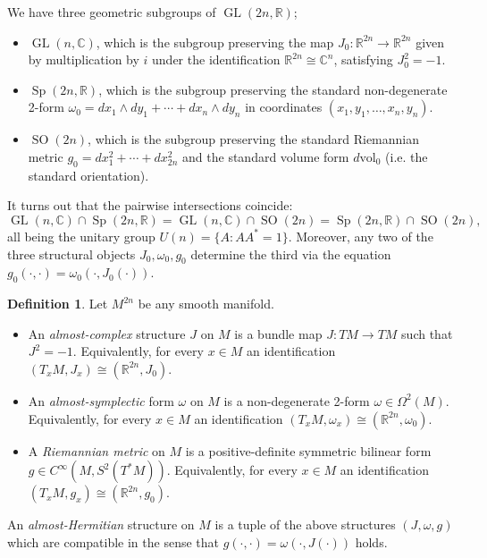 \documentclass{article}
\theoremstyle{definition}
\newtheorem*{definition}{Definition}
\DeclareMathOperator{\Sp}{Sp}
\DeclareMathOperator{\SO}{SO}
\DeclareMathOperator{\GL}{GL}
\newcommand{\R}{\mathbb{R}}
\newcommand{\C}{\mathbb{C}}
\begin{document}
We have three geometric subgroups of $\GL(2n,\R)$;
\begin{itemize}
    \item $\GL(n,\C)$, which is the subgroup preserving the map
        $J_0:\R^{2n}\to\R^{2n}$ given by multiplication by $i$ under the
        identification $\R^{2n}\cong\C^n$, satisfying $J_0^2=-1$.

    \item $\Sp(2n,\R)$, which is the subgroup preserving the standard
        non-degenerate 2-form $\omega_0=dx_1\wedge dy_1+\cdots+dx_n\wedge dy_n$
        in coordinates $(x_1,y_1,\ldots,x_n,y_n)$.

    \item $\SO(2n)$, which is the subgroup preserving the standard Riemannian
        metric $g_0=dx_1^2+\cdots+dx_{2n}^2$ and the standard volume form
        $d\text{vol}_0$ (i.e. the standard orientation).
\end{itemize}
It turns out that the pairwise intersections coincide:
\begin{equation*}
    \GL(n,\C)\cap\Sp(2n,\R)
        = \GL(n,\C)\cap\SO(2n)
        = \Sp(2n,\R)\cap\SO(2n),
\end{equation*}
all being the unitary group $U(n)=\{A:AA^*=1\}$. Moreover, any two of the three
structural objects $J_0,\omega_0,g_0$ determine the third via the equation
$g_0(\cdot,\cdot)=\omega_0(\cdot,J_0(\cdot))$.

\begin{definition}
    Let $M^{2n}$ be any smooth manifold.
    \begin{itemize}
        \item An \emph{almost-complex} structure $J$ on $M$ is a bundle map
            $J:TM\to TM$ such that $J^2=-1$. Equivalently, for every $x\in M$ an
            identification $(T_xM,J_x)\cong(\R^{2n},J_0)$.

        \item An \emph{almost-symplectic} form $\omega$ on $M$ is a
            non-degenerate 2-form $\omega\in\Omega^2(M)$. Equivalently, for
            every $x\in M$ an identification
            $(T_xM,\omega_x)\cong(\R^{2n},\omega_0)$.

        \item A \emph{Riemannian metric} on $M$ is a positive-definite symmetric
            bilinear form $g\in C^\infty(M,S^2(T^*M))$. Equivalently, for every
            $x\in M$ an identification $(T_xM,g_x)\cong(\R^{2n},g_0)$.
    \end{itemize}
    An \emph{almost-Hermitian} structure on $M$ is a tuple of the above
    structures $(J,\omega,g)$ which are compatible in the sense that
    $g(\cdot,\cdot)=\omega(\cdot,J(\cdot))$ holds.
\end{definition}
\end{document}
